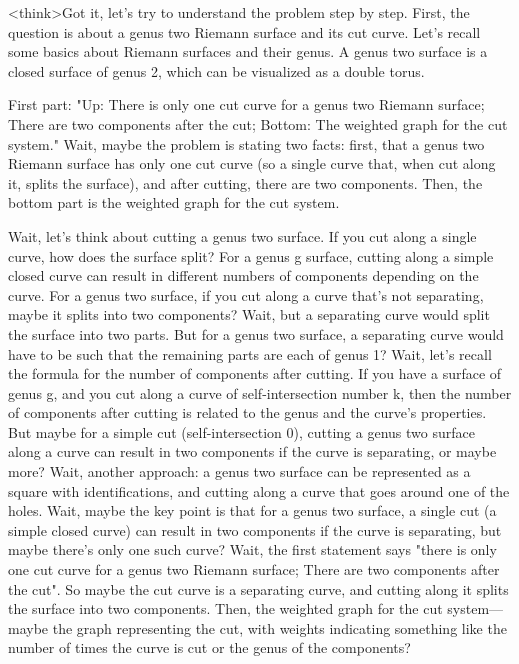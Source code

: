 <think>Got it, let's try to understand the problem step by step. First, the question is about a genus two Riemann surface and its cut curve. Let's recall some basics about Riemann surfaces and their genus. A genus two surface is a closed surface of genus 2, which can be visualized as a double torus. 

First part: "Up: There is only one cut curve for a genus two Riemann surface; There are two components after the cut; Bottom: The weighted graph for the cut system." Wait, maybe the problem is stating two facts: first, that a genus two Riemann surface has only one cut curve (so a single curve that, when cut along it, splits the surface), and after cutting, there are two components. Then, the bottom part is the weighted graph for the cut system. 

Wait, let's think about cutting a genus two surface. If you cut along a single curve, how does the surface split? For a genus g surface, cutting along a simple closed curve can result in different numbers of components depending on the curve. For a genus two surface, if you cut along a curve that's not separating, maybe it splits into two components? Wait, but a separating curve would split the surface into two parts. But for a genus two surface, a separating curve would have to be such that the remaining parts are each of genus 1? Wait, let's recall the formula for the number of components after cutting. If you have a surface of genus g, and you cut along a curve of self-intersection number k, then the number of components after cutting is related to the genus and the curve's properties. But maybe for a simple cut (self-intersection 0), cutting a genus two surface along a curve can result in two components if the curve is separating, or maybe more? Wait, another approach: a genus two surface can be represented as a square with identifications, and cutting along a curve that goes around one of the holes. Wait, maybe the key point is that for a genus two surface, a single cut (a simple closed curve) can result in two components if the curve is separating, but maybe there's only one such curve? Wait, the first statement says "there is only one cut curve for a genus two Riemann surface; There are two components after the cut". So maybe the cut curve is a separating curve, and cutting along it splits the surface into two components. Then, the weighted graph for the cut system—maybe the graph representing the cut, with weights indicating something like the number of times the curve is cut or the genus of the components? 

